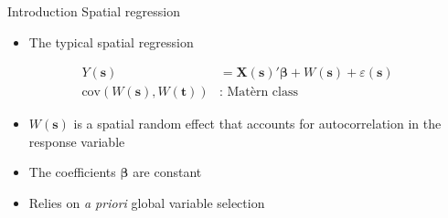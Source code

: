 \documentclass[12pt,t]{beamer}
\newcommand{\subt}[1]{{\footnotesize \color{subtitle} {#1}}}
\begin{document}
\begin{frame}{Introduction}
\subt{Spatial regression \citep{Cressie:1993}}

\bigskip
\begin{itemize}
    \item The typical spatial regression
\end{itemize}
\begin{align*}
    Y(\bm{s}) &= \bm{X}(\bm{s})'\bm{\beta} + W(\bm{s}) + \varepsilon(\bm{s}) \\
    \text{cov}(W(\bm{s}), W(\bm{t})) &\text{: Mat\`{e}rn class}    
\end{align*}

\begin{itemize}
    \item $W(\bm{s})$ is a spatial random effect that accounts for autocorrelation in the response variable
    \item The coefficients $\bm{\beta}$ are constant
    \item Relies on \emph{a priori} global variable selection
\end{itemize}

\end{frame}
\end{document}
